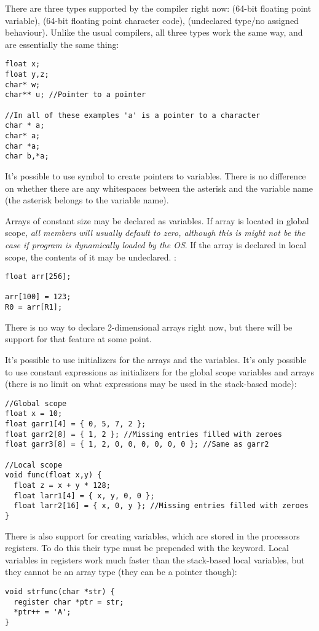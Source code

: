 There are three types supported by the compiler right now:  (64-bit floating point variable),  (64-bit floating point character code),  (undeclared type/no assigned behaviour). Unlike the usual compilers, all three types work the same way, and are essentially the same thing:
\begin{verbatim}
float x;
float y,z;
char* w;
char** u; //Pointer to a pointer

//In all of these examples 'a' is a pointer to a character
char * a;
char* a;
char *a;
char b,*a;
\end{verbatim}

It's possible to use \reg{*} symbol to create pointers to variables. There is no difference on whether there are any whitespaces between the asterisk and the variable name (the asterisk belongs to the variable name).

Arrays of constant size may be declared as variables. If array is located in global scope, \emph{all members will usually default to zero, although this is might not be the case if program is dynamically loaded by the OS}. If the array is declared in local scope, the contents of it may be undeclared. :
\begin{verbatim}
float arr[256];

arr[100] = 123;
R0 = arr[R1];
\end{verbatim}

There is no way to declare 2-dimensional arrays right now, but there will be support for that feature at some point.

It's possible to use initializers for the arrays and the variables. It's only possible to use constant expressions as initializers for the global scope variables and arrays (there is no limit on what expressions may be used in the stack-based mode):
\begin{verbatim}
//Global scope
float x = 10;
float garr1[4] = { 0, 5, 7, 2 };
float garr2[8] = { 1, 2 }; //Missing entries filled with zeroes
float garr3[8] = { 1, 2, 0, 0, 0, 0, 0, 0 }; //Same as garr2

//Local scope
void func(float x,y) {
  float z = x + y * 128;
  float larr1[4] = { x, y, 0, 0 };
  float larr2[16] = { x, 0, y }; //Missing entries filled with zeroes
}
\end{verbatim}

There is also support for creating variables, which are stored in the processors registers. To do this their type must be prepended with the  keyword. Local variables in registers work much faster than the stack-based local variables, but they cannot be an array type (they can be a pointer though):
\begin{verbatim}
void strfunc(char *str) {
  register char *ptr = str;  
  *ptr++ = 'A';
}
\end{verbatim}

